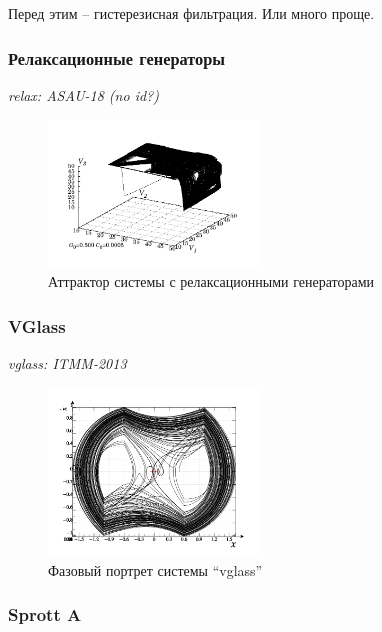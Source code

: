 \documentclass[a4paper,12pt]{article}
\newcommand{\LinkRef}[1]{ \textit{#1} }
\begin{document}
Перед этим -- гистерезисная фильтрация.
Или много проще.



\FloatBarrier
\subsubsection{Релаксационные генераторы}


\LinkRef{
  relax: ASAU-18 (no id?)
}

\begin{figure}[htb!]
\centerline{\includegraphics[width=0.5\textwidth]{p/cha/relax_phase3_0500.pdf} }
\caption{Аттрактор системы с релаксационными генераторами}
\label{atu:f:relax_phase3}
\end{figure}



\FloatBarrier
\subsubsection{VGlass} %

\LinkRef{
  vglass: ITMM-2013
}

\begin{figure}[htb!]
\centerline{\includegraphics[width=0.5\textwidth]{p/cha/vg1-graph_phase.png} }
\caption{Фазовый портрет системы ``vglass'' }
\label{atu:f:vglass_phase}
\end{figure}

\FloatBarrier
\subsubsection{Sprott A}
\end{document}
